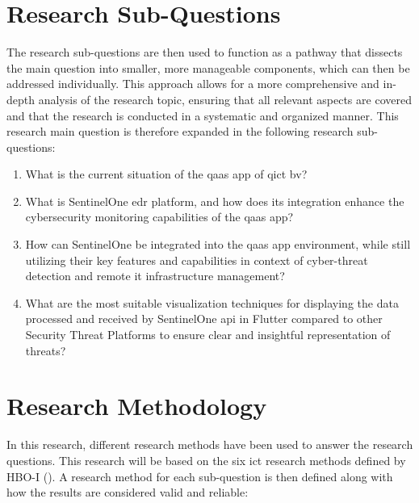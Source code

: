 \section{Research Sub-Questions}
The research sub-questions are then used to function as a pathway that dissects the main
question into smaller, more manageable components, which can then be addressed individually. This approach
allows for a more comprehensive and in-depth analysis of the research topic, ensuring that all relevant
aspects are covered and that the research is conducted in a systematic and organized manner.
This research main question is therefore expanded in the following research sub-questions:
\begin{enumerate}
      \item What is the current situation of the \acrshort{qaas} app of \acrlong{qict} \acrshort{bv}?
      \item What is SentinelOne \acrshort{edr} platform, and how does its integration enhance the cybersecurity
            monitoring capabilities of the \acrshort{qaas} app?
      \item How can SentinelOne be integrated into the \acrshort{qaas} app environment, while still
            utilizing their key features and capabilities in context of cyber-threat detection and
            remote \acrshort{it} infrastructure management?
      \item What are the most suitable visualization techniques for displaying the data processed and
            received by  SentinelOne \acrshort{api} in Flutter compared to other Security Threat Platforms to
            ensure clear and insightful representation of threats?
\end{enumerate}
\section{Research Methodology}
In this research, different research methods have been used to answer the research questions. This research
will be based on the six \acrshort{ict} research methods defined by HBO-I (\cite{ictresearchmethods}). A
research method for each sub-question is then defined along with how the results are considered valid and
reliable:
